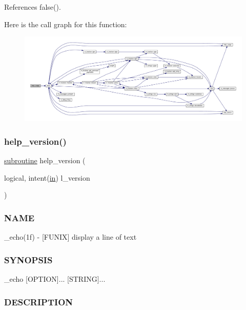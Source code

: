 References false().

Here is the call graph for this function\+:
\nopagebreak
\begin{figure}[H]
\begin{center}
\leavevmode
\includegraphics[width=350pt]{__echo_8f90_a3e09a3b52ee8fb04eeb93fe5761626a8_cgraph}
\end{center}
\end{figure}
\mbox{\label{__echo_8f90_a39c21619b08a3c22f19e2306efd7f766}} 
\subsubsection{\texorpdfstring{help\+\_\+version()}{help\_version()}}
{\footnotesize\ttfamily \hyperlink{M__stopwatch_83_8txt_acfbcff50169d691ff02d4a123ed70482}{subroutine} help\+\_\+version (\begin{DoxyParamCaption}\item[{logical, intent(\hyperlink{M__journal_83_8txt_afce72651d1eed785a2132bee863b2f38}{in})}]{l\+\_\+version }\end{DoxyParamCaption})}



\subsubsection*{N\+A\+ME}

\+\_\+echo(1f) -\/ \mbox{[}F\+U\+N\+IX\mbox{]} display a line of text \subsubsection*{S\+Y\+N\+O\+P\+S\+IS}

\+\_\+echo \mbox{[}O\+P\+T\+I\+ON\mbox{]}... \mbox{[}S\+T\+R\+I\+NG\mbox{]}... \subsubsection*{D\+E\+S\+C\+R\+I\+P\+T\+I\+ON}


